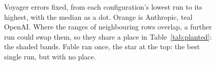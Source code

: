 \begin{figure}[H]
\caption{Voyager errors fixed, from each configuration's lowest run to its highest, with
the median as a dot. Orange is Anthropic, teal OpenAI. Where the ranges of neighbouring
rows overlap, a further run could swap them, so they share a place in Table~\ref{tab:planted}:
the shaded bands. Fable ran once, the star at the top: the best single run, but with no place.}
\label{fig:ranges}
\floatfoot
\end{figure}
